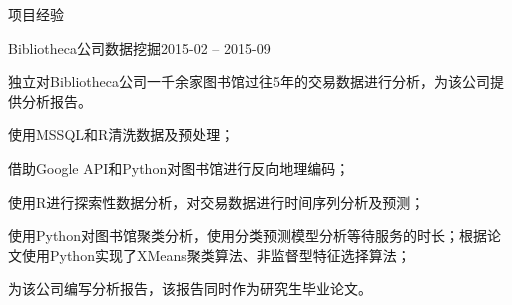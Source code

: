 \documentclass{resume} %
\begin{document}
\begin{rSection}{项目经验}
\begin{rSubsection}{Bibliotheca公司数据挖掘}{2015-02 -- 2015-09}{}{}
\item 独立对Bibliotheca公司一千余家图书馆过往5年的交易数据进行分析，为该公司提供分析报告。
\item 使用MSSQL和R清洗数据及预处理；
\item 借助Google API和Python对图书馆进行反向地理编码；
\item 使用R进行探索性数据分析，对交易数据进行时间序列分析及预测；
\item 使用Python对图书馆聚类分析，使用分类预测模型分析等待服务的时长；根据论文使用Python实现了XMeans聚类算法、非监督型特征选择算法；
\item 为该公司编写分析报告，该报告同时作为研究生毕业论文。

\end{rSubsection}
\end{rSection}


\end{document}
